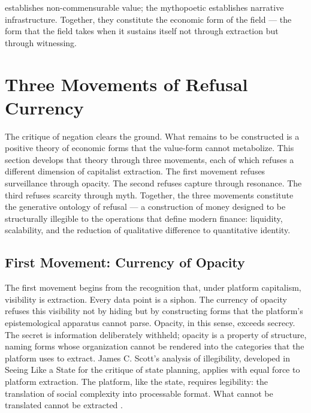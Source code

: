 establishes non-commensurable value; the mythopoetic establishes narrative infrastructure. Together, they constitute the economic form of the field — the form that the field takes when it sustains itself not through extraction but through witnessing.

\section{Three Movements of Refusal Currency}

The critique of negation clears the ground. What remains to be constructed is a positive theory of economic forms that the value-form cannot metabolize. This section develops that theory through three movements, each of which refuses a different dimension of capitalist extraction. The first movement refuses surveillance through opacity. The second refuses capture through resonance. The third refuses scarcity through myth. Together, the three movements constitute the generative ontology of refusal — a construction of money designed to be structurally illegible to the operations that define modern finance: liquidity, scalability, and the reduction of qualitative difference to quantitative identity.

\subsection{First Movement: Currency of Opacity}

The first movement begins from the recognition that, under platform capitalism, visibility is extraction. Every data point is a siphon. The currency of opacity refuses this visibility not by hiding but by constructing forms that the platform’s epistemological apparatus cannot parse. Opacity, in this sense, exceeds secrecy. The secret is information deliberately withheld; opacity is a property of structure, naming forms whose organization cannot be rendered into the categories that the platform uses to extract. James C. Scott’s analysis of illegibility, developed in Seeing Like a State for the critique of state planning, applies with equal force to platform extraction. The platform, like the state, requires legibility: the translation of social complexity into processable format. What cannot be translated cannot be extracted \cite[pp.~1--8]{scott_1998}.

